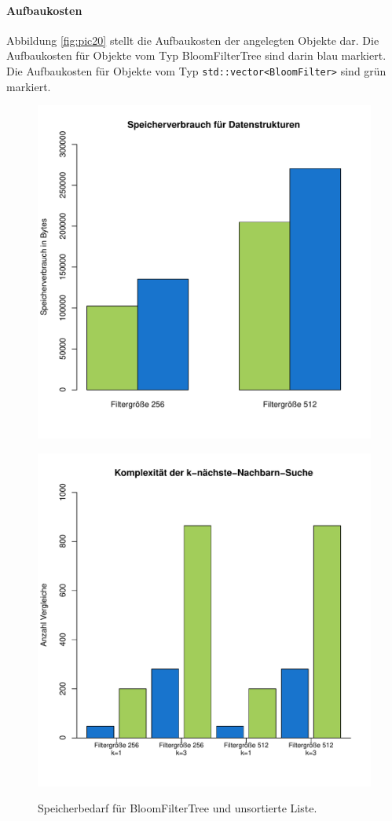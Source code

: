 \paragraph*{Aufbaukosten}
Abbildung \ref{fig:pic20} stellt die Aufbaukosten der angelegten Objekte dar. Die Aufbaukosten für Objekte vom Typ BloomFilterTree sind darin blau markiert. Die Aufbaukosten für Objekte vom Typ \texttt{std::vector<BloomFilter>} sind grün markiert. 
\begin{figure}[hptb]
	\centering
	\includegraphics[scale=0.7]{pictures/mem.pdf}\\
	\caption[Speicherbedarf für BloomFilterTree und unsortierte Liste]{Speicherbedarf für BloomFilterTree und unsortierte Liste.}\label{fig:pic18} 
	\includegraphics[scale=0.7]{pictures/compl.pdf}\\

\end{figure}
